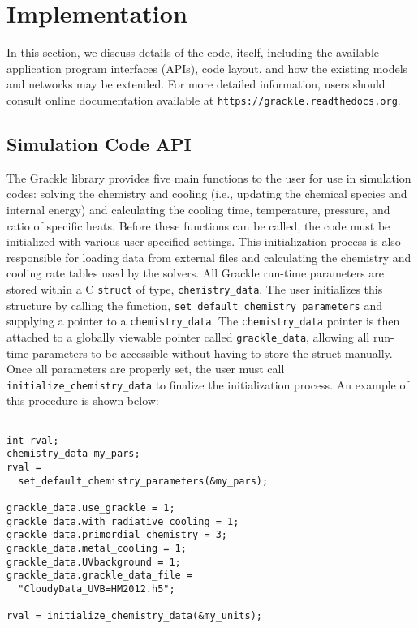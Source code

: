 \section{Implementation} \label{methods:code}

In this section, we discuss details of the code, itself, including the
available application program interfaces (APIs), code layout, and how
the existing models and networks may be extended.  For more detailed
information, users should consult online documentation available at
\texttt{https://grackle.readthedocs.org}.

\subsection{Simulation Code API}

The Grackle library provides five main functions to the user for use
in simulation codes: solving the chemistry and cooling (i.e.,
updating the chemical species and internal energy) and calculating the
cooling time, temperature, pressure, and ratio of specific heats.
Before these functions can be called, the code must be initialized
with various user-specified settings.  This initialization process is
also responsible for loading data from external files and calculating
the chemistry and cooling rate tables used by the solvers.  All
Grackle run-time parameters are stored within a C \texttt{struct} of type,
\texttt{chemistry\_data}.  The user initializes this structure by
calling the function, \texttt{set\_default\_chemistry\_parameters}
and supplying a pointer to a \texttt{chemistry\_data}.  The
\texttt{chemistry\_data} pointer is then attached to a globally
viewable pointer called \texttt{grackle\_data}, allowing all run-time
parameters to be accessible without having to store the struct
manually.  Once all parameters are properly set, the user must call
\texttt{initialize\_chemistry\_data} to finalize the initialization
process.  An example of this procedure is shown below:

\vspace{0.5cm}
\begin{minipage}[b]{0.5\linewidth}
\begin{verbatim}

int rval;
chemistry_data my_pars;
rval =
  set_default_chemistry_parameters(&my_pars);

grackle_data.use_grackle = 1;
grackle_data.with_radiative_cooling = 1;
grackle_data.primordial_chemistry = 3;
grackle_data.metal_cooling = 1;
grackle_data.UVbackground = 1;
grackle_data.grackle_data_file = 
  "CloudyData_UVB=HM2012.h5";

rval = initialize_chemistry_data(&my_units);

\end{verbatim}
\end{minipage}

